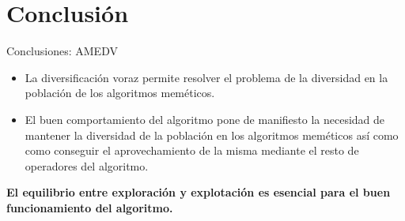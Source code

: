
\section{Conclusión}

	\begin{frame}{Conclusiones: AMEDV}
		\begin{itemize}
			\item La diversificación voraz permite resolver el problema de la diversidad en la población de los algoritmos meméticos.
			\item El buen comportamiento del algoritmo pone de manifiesto la necesidad de mantener la diversidad de la población en los algoritmos meméticos así como como conseguir el aprovechamiento de la misma mediante el resto de operadores del algoritmo.
		\end{itemize}
		
		\begin{tcolorbox}[colback=blue!5,colframe=blue!30]
			\centering
			\color{blue!80} \textbf{El equilibrio entre exploración y explotación es esencial para el buen funcionamiento del algoritmo.}
		\end{tcolorbox}
	\end{frame}


	\begin{frame}
	
	\end{frame}
	